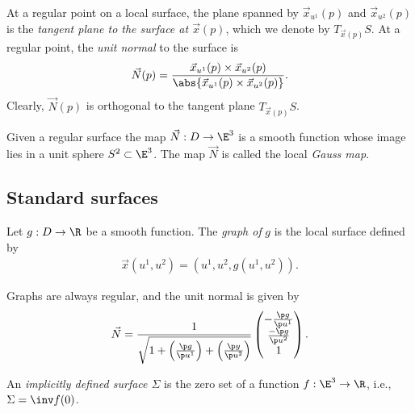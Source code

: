 \documentclass{article}
\begin{document}
\begin{definition}
	At a regular point on a local surface, the plane spanned by $\vec x_{u^1}(p)$
	and $\vec x_{u^2}(p)$ is the \emph{tangent plane to the surface at $\vec x(p)$},
	which we denote by $T_{\vec x(p)}S$. At a regular point, the \emph{unit normal}
	to the surface is
	\begin{align*}
		\vec N(p)=\frac{\vec x_{u^1}(p)\times\vec x_{u^2}(p)}{\abs{\vec x_{u^1}(p)\times\vec x_{u^2}(p)}}.
	\end{align*}
	Clearly, $\vec N(p)$ is orthogonal to the tangent plane $T_{\vec x(p)}S$.
\end{definition}

\begin{proposition}[Notes 6.7]
	Given a regular surface the map $\vec N:D\to\E^3$ is a smooth function whose
	image lies in a unit sphere $S^2\subset\E^3$. The map $\vec N$ is called the
	local \emph{Gauss map}.
\end{proposition}

\subsection{Standard surfaces}

\begin{definition}
	Let $g:D\to\R$ be a smooth function. The \emph{graph of} $g$ is the local surface
	defined by
	\begin{align*}
		\vec x(u^1, u^2) = (u^1, u^2, g(u^1, u^2)).
	\end{align*}
\end{definition}

\begin{proposition}[Notes 6.11]
	Graphs are always regular, and the unit normal is given by
	\begin{align*}
		\vec N = \frac{1}{\sqrt{1 + \left(\frac{\p g}{\p u^1}\right) + \left(\frac{\p y}{\p u^2}\right)}}\begin{pmatrix}
			-\frac{\p g}{\p u^1} \\ \frac{-\p g}{\p u^2} \\ 1
		\end{pmatrix}.
	\end{align*}
\end{proposition}

\begin{definition}
	An \emph{implicitly defined surface $\Sigma$} is the zero set of a function
	$f:\E^3\to\R$, i.e., $\Sigma=\inv f(0)$.
\end{definition}
\end{document}
